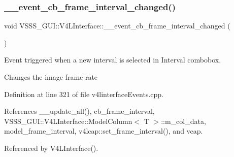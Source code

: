 \subsubsection{\texorpdfstring{\+\_\+\+\_\+event\+\_\+cb\+\_\+frame\+\_\+interval\+\_\+changed()}{\_\_event\_cb\_frame\_interval\_changed()}}
{\footnotesize\ttfamily void V\+S\+S\+S\+\_\+\+G\+U\+I\+::\+V4\+L\+Interface\+::\+\_\+\+\_\+event\+\_\+cb\+\_\+frame\+\_\+interval\+\_\+changed (\begin{DoxyParamCaption}{ }\end{DoxyParamCaption})}



Event triggered when a new interval is selected in Interval combobox. 

Changes the image frame rate 

Definition at line 321 of file v4linterface\+Events.\+cpp.



References \+\_\+\+\_\+update\+\_\+all(), cb\+\_\+frame\+\_\+interval, V\+S\+S\+S\+\_\+\+G\+U\+I\+::\+V4\+L\+Interface\+::\+Model\+Column$<$ T $>$\+::m\+\_\+col\+\_\+data, model\+\_\+frame\+\_\+interval, v4lcap\+::set\+\_\+frame\+\_\+interval(), and vcap.



Referenced by V4\+L\+Interface().


